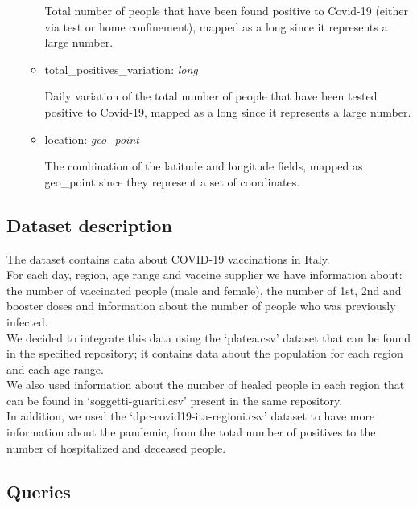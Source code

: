 \documentclass[12pt, a4paper]{article}
\begin{document}
\begin{itemize}
\begin{itemize}
\begin{footnotesize}
          Total number of people that have been found positive to Covid-19 (either via 
          test or home confinement), mapped as a long since it represents a large number.
        \end{footnotesize} 
      \item total\_positives\_variation: \emph{long} \\
        \begin{footnotesize}
          Daily variation of the total number of people that have been tested positive 
          to Covid-19, mapped as a long since it represents a large number.
        \end{footnotesize}
      \item location: \emph{geo\_point} \\
        \begin{footnotesize}
          The combination of the latitude and longitude fields, mapped as geo\_point 
          since they represent a set of coordinates.
        \end{footnotesize}    
    \end{itemize}
\end{itemize}

\subsection{Dataset description}

The dataset contains data about COVID-19 vaccinations in Italy. \\
For each day, region, age range and vaccine supplier we have information about: the 
number of vaccinated people (male and female), the number of 1st, 2nd and booster doses
and information about the number of people who was previously infected. \\
We decided to integrate this data using the ‘platea.csv’ dataset that can be found 
in the specified repository; it contains data about the population for each region 
and each age range. \\ 
We also used information about the number of healed people in each region that can be 
found in ‘soggetti-guariti.csv’ present in the same repository. \\
In addition, we used the ‘dpc-covid19-ita-regioni.csv’ dataset to have more information 
about the pandemic, from the total number of positives to the number of hospitalized 
and deceased people.

\subsection{Queries}
\end{document}
